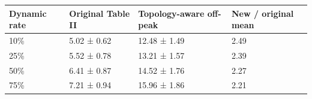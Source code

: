 \begin{tabular}{llll}
\hline
Dynamic rate & Original Table II & Topology-aware off-peak & New / original mean \\
\hline
10\% & 5.02 ± 0.62 & 12.48 ± 1.49 & 2.49 \\
25\% & 5.52 ± 0.78 & 13.21 ± 1.57 & 2.39 \\
50\% & 6.41 ± 0.87 & 14.52 ± 1.76 & 2.27 \\
75\% & 7.21 ± 0.94 & 15.96 ± 1.86 & 2.21 \\
\hline
\end{tabular}
